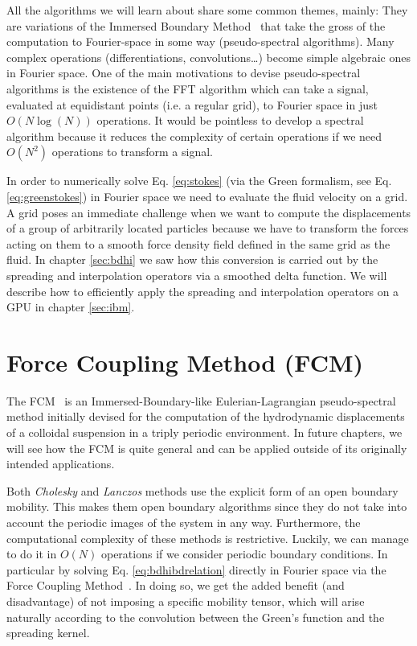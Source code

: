 \documentclass[ twoside,openright,titlepage,numbers=noenddot,%
headinclude,footinclude,cleardoublepage=empty,abstract=on,
BCOR=5mm,paper=b5,fontsize=11pt, dvipsnames
]{scrreprt}
\newcommand{\gpu}{\gls{GPU}\xspace}
\begin{document}
All the algorithms we will learn about share some common themes, mainly: They are variations of the Immersed Boundary Method~\cite{Peskin2002} that take the gross of the computation to Fourier-space in some way (pseudo-spectral algorithms). Many complex operations (differentiations, convolutions\dots) become simple algebraic ones in Fourier space. One of the main motivations to devise pseudo-spectral algorithms is the existence of the \gls{FFT} algorithm which can take a signal, evaluated at equidistant points (i.e. a regular grid), to Fourier space in just $O(N\log(N))$ operations. It would be pointless to develop a spectral algorithm because it reduces the complexity of certain operations if we need $O(N^2)$ operations to transform a signal.

In order to numerically solve Eq. \eqref{eq:stokes} (via the Green formalism, see Eq. \eqref{eq:greenstokes}) in Fourier space we need to evaluate the fluid velocity on a grid.
A grid poses an immediate challenge when we want to compute the displacements of a group of arbitrarily located particles because we have to transform the forces acting on them to a smooth force density field defined in the same grid as the fluid. In chapter \ref{sec:bdhi} we saw how this conversion is carried out by the spreading and interpolation operators via a smoothed delta function. We will describe how to efficiently apply the spreading and interpolation operators on a \gpu in chapter \ref{sec:ibm}.



\section{Force Coupling Method (FCM)}\label{sec:fcm}
The \gls{FCM}~\cite{Keaveny2014} is an Immersed-Boundary-like Eulerian-Lagrangian pseudo-spectral method initially devised for the computation of the hydrodynamic displacements of a colloidal suspension in a triply periodic environment. In future chapters, we will see how the \gls{FCM} is quite general and can be applied outside of its originally intended applications.

Both \emph{Cholesky} and \emph{Lanczos} methods use the explicit form of an open boundary mobility. This makes them open boundary algorithms since they do not take into account the periodic images of the system in any way. Furthermore, the computational complexity of these methods is restrictive. Luckily, we can manage to do it in $O(N)$ operations if we consider periodic boundary conditions. In particular by solving Eq. \eqref{eq:bdhibdrelation} directly in Fourier space via the Force Coupling Method~\cite{Keaveny2014}. In doing so, we get the added benefit (and disadvantage) of not imposing a specific mobility tensor, which will arise naturally according to the convolution between the Green's function and the spreading kernel.
\end{document}
